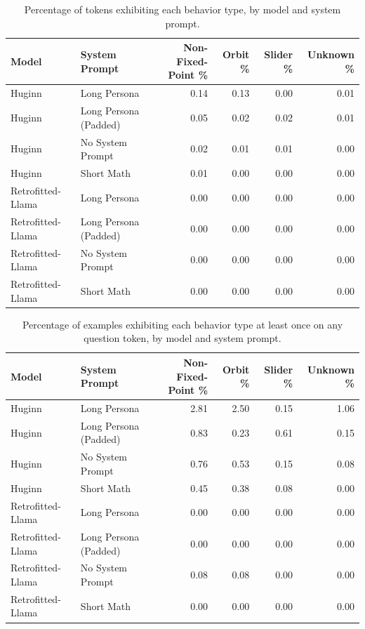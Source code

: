 \begin{table}
\centering
\caption{Percentage of tokens exhibiting each behavior type, by model and system prompt.}
\label{tab:behavior_tokens}
\begin{tabular}{llrrrr}
\toprule
Model & System Prompt & Non-Fixed-Point \% & Orbit \% & Slider \% & Unknown \% \\
\midrule
Huginn & Long Persona & 0.14 & 0.13 & 0.00 & 0.01 \\
Huginn & Long Persona (Padded) & 0.05 & 0.02 & 0.02 & 0.01 \\
Huginn & No System Prompt & 0.02 & 0.01 & 0.01 & 0.00 \\
Huginn & Short Math & 0.01 & 0.00 & 0.00 & 0.00 \\
Retrofitted-Llama & Long Persona & 0.00 & 0.00 & 0.00 & 0.00 \\
Retrofitted-Llama & Long Persona (Padded) & 0.00 & 0.00 & 0.00 & 0.00 \\
Retrofitted-Llama & No System Prompt & 0.00 & 0.00 & 0.00 & 0.00 \\
Retrofitted-Llama & Short Math & 0.00 & 0.00 & 0.00 & 0.00 \\
\bottomrule
\end{tabular}
\end{table}

\begin{table}
\centering
\caption{Percentage of examples exhibiting each behavior type at least once on any question token, by model and system prompt.}
\label{tab:behavior_existence}
\begin{tabular}{llrrrr}
\toprule
Model & System Prompt & Non-Fixed-Point \% & Orbit \% & Slider \% & Unknown \% \\
\midrule
Huginn & Long Persona & 2.81 & 2.50 & 0.15 & 1.06 \\
Huginn & Long Persona (Padded) & 0.83 & 0.23 & 0.61 & 0.15 \\
Huginn & No System Prompt & 0.76 & 0.53 & 0.15 & 0.08 \\
Huginn & Short Math & 0.45 & 0.38 & 0.08 & 0.00 \\
Retrofitted-Llama & Long Persona & 0.00 & 0.00 & 0.00 & 0.00 \\
Retrofitted-Llama & Long Persona (Padded) & 0.00 & 0.00 & 0.00 & 0.00 \\
Retrofitted-Llama & No System Prompt & 0.08 & 0.08 & 0.00 & 0.00 \\
Retrofitted-Llama & Short Math & 0.00 & 0.00 & 0.00 & 0.00 \\
\bottomrule
\end{tabular}
\end{table}

